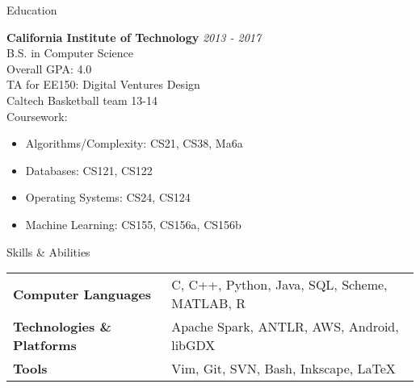 \documentclass{resume} %
\begin{document}

\begin{rSection}{Education}

{\bf California Institute of Technology} \hfill {\em 2013 - 2017} \\
B.S. in Computer Science  \\
Overall GPA: 4.0 \smallskip \\
TA for EE150: Digital Ventures Design \\
Caltech Basketball team 13-14 \smallskip \\
Coursework:
\vspace{-5.0mm}
\begin{minipage}{0.43\linewidth}
\begin{itemize}
    \item{Algorithms/Complexity: CS21, CS38, Ma6a}
    \item{Databases: CS121, CS122}
\end{itemize}
\end{minipage}
\begin{minipage}{0.43\linewidth}
\begin{itemize}
    \item{Operating Systems: CS24, CS124}
    \item{Machine Learning: CS155, CS156a, CS156b}
\end{itemize}
\end{minipage}
\vspace{5mm}
\end{rSection}


\begin{rSection}{Skills \& Abilities}

\begin{tabularx}{\textwidth}{@{}lX}
    \bfseries{Computer Languages}   &  C, C++, Python, Java, SQL, Scheme, MATLAB, R \\
    \bfseries{Technologies \& Platforms}   &  Apache Spark, ANTLR, AWS, Android, libGDX \\
    \bfseries{Tools}   &  Vim, Git, SVN, Bash, Inkscape, \LaTeX \\
\end{tabularx}

\end{rSection}
\end{document}
